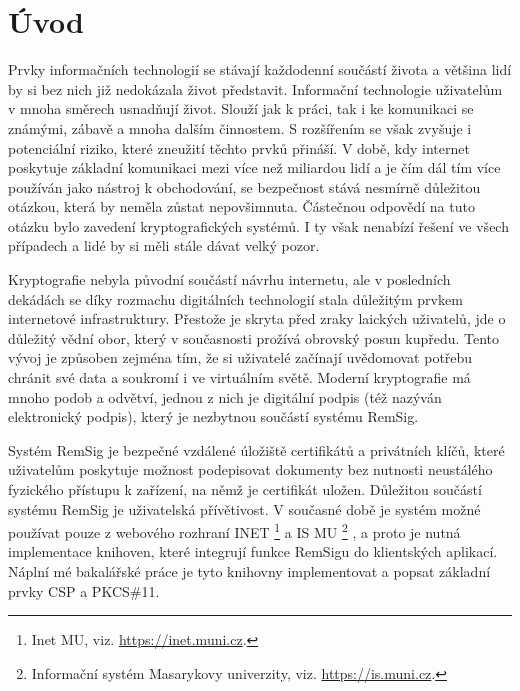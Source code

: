 \documentclass[]{fithesis3}
\begin{document}
\chapter{Úvod}

Prvky informačních technologií se stávají každodenní součástí života a většina lidí by si bez nich již nedokázala život představit. Informační technologie uživatelům v mnoha směrech usnadňují život. Slouží jak k práci, tak i ke komunikaci se známými, zábavě a mnoha dalším činnostem. S rozšířením se však zvyšuje i potenciální riziko, které zneužití těchto prvků přináší. V době, kdy internet poskytuje základní komunikaci mezi více než miliardou lidí a je čím dál tím více používán jako nástroj k obchodování, se bezpečnost stává nesmírně důležitou otázkou, která by neměla zůstat nepovšimnuta. Částečnou odpovědí na tuto otázku bylo zavedení kryptografických systémů. I ty však nenabízí řešení ve všech případech a lidé by si měli stále dávat velký pozor. 

Kryptografie nebyla původní součástí návrhu internetu, ale v posledních dekádách se díky rozmachu digitálních technologií stala důležitým prvkem internetové infrastruktury. Přestože je skryta před zraky laických uživatelů, jde o důležitý vědní obor, který v současnosti prožívá obrovský posun kupředu. Tento vývoj je způsoben zejména tím, že si uživatelé začínají uvědomovat potřebu chránit své data a soukromí i ve virtuálním světě. Moderní kryptografie má mnoho podob a odvětví, jednou z nich je digitální podpis (též nazýván elektronický podpis), který je nezbytnou součástí systému RemSig.

Systém RemSig je bezpečné vzdálené úložiště certifikátů a privátních klíčů, které uživatelům poskytuje možnost podepisovat dokumenty bez nutnosti neustálého fyzického přístupu k zařízení, na němž je certifikát uložen. Důležitou součástí systému RemSig je uživatelská přívětivost. V současné době je systém možné používat pouze z webového rozhraní INET
\footnote{Inet MU, viz. \url{https://inet.muni.cz}.} 
a IS MU
\footnote{Informační systém Masarykovy univerzity, viz. \url{https://is.muni.cz}.}
, a proto je nutná implementace knihoven, které integrují funkce RemSigu do klientských aplikací. Náplní mé bakalářské práce je tyto knihovny implementovat a popsat základní prvky CSP a PKCS\#11. 
\end{document}
